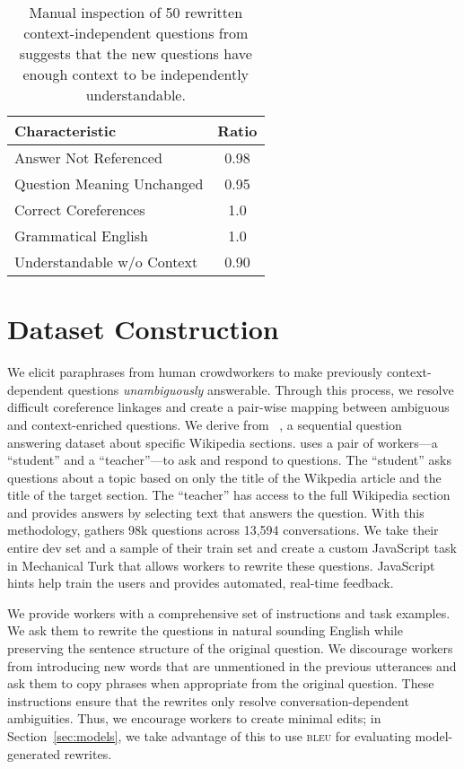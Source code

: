 
\begin{table}[t]
	\centering
	\begin{tabular}{l c}
          \toprule
	\textbf{	Characteristic }& \textbf{Ratio}\\
		\hline
		Answer Not Referenced & 0.98 \\
		Question Meaning Unchanged &  0.95 \\
		Correct Coreferences & 1.0 \\
		Grammatical English & 1.0 \\
		Understandable w/o Context & 0.90 \\
                \bottomrule
	\end{tabular}
    \caption{Manual inspection of 50 rewritten context-independent questions from \name{} suggests that the new questions have enough context to be independently understandable.}
    \label{tab:manualreview}
\end{table}

\section{Dataset Construction 
	\label{sec:data}}

We elicit paraphrases from human crowdworkers to make previously
context-dependent questions \textit{unambiguously} answerable.
Through this process, we resolve difficult coreference linkages and
create a pair-wise mapping between ambiguous and context-enriched
questions.
We derive \name{} from \abr{\quac}~\cite{ChoiQuAC2018}, a sequential
question answering dataset about specific Wikipedia sections.
\abr{\quac} uses a pair of workers---a ``student'' and a ``teacher''---to ask
and respond to questions.
The ``student'' asks questions about a topic based on only the title
of the Wikpedia article and the title of the target section.
The ``teacher'' has access to the full Wikipedia section and provides answers by selecting text that answers the question.
With this methodology, \abr{\quac} gathers 98k questions across 13,594 conversations.
We take their entire dev set and a sample of their train set and
create a custom JavaScript task in Mechanical Turk that allows
workers to rewrite these questions.
JavaScript hints help train the users and provides automated, real-time feedback.

We provide workers with a comprehensive set of instructions and task examples. 
We ask them to rewrite the questions in natural sounding English while preserving the sentence structure of the original question.  We discourage workers from introducing new words that are unmentioned
in the previous utterances and ask them to copy phrases when appropriate from the original question.
These instructions ensure that the rewrites only resolve
conversation-dependent ambiguities.
Thus, we encourage workers to create minimal edits; in
Section~\ref{sec:models}, we take advantage of this to use
\textsc{bleu} for evaluating model-generated rewrites.


